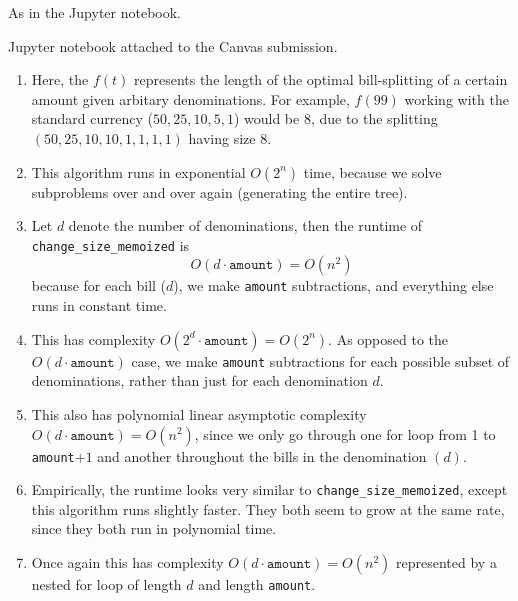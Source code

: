 \begin{prob}
    As in the Jupyter notebook.
\end{prob}
\begin{solution}
    Jupyter notebook attached to the Canvas submission.
   \begin{enumerate}[label=(\alph*)]
   \setlength\itemsep{-.2em}
       \item Here, the $f(t)$ represents the length of the optimal bill-splitting of a certain amount given arbitary denominations. For example, $f(99)$ working with the standard currency ($50,25,10,5,1$) would be 8, due to the splitting $(50,25,10,10,1,1,1,1)$ having size 8.
       \item This algorithm runs in exponential $O(2^n )$ time, because we solve subproblems over and over again (generating the entire tree).
       \item Let $d$ denote the number of denominations, then the runtime of \texttt{change\_size\_memoized} is 
           \[
           O(d\cdot \texttt{amount})= O(n^2)
       \] because for each bill ($d$), we make \texttt{amount} subtractions, and everything else runs in constant time.
   \item This has complexity $O(2^d\cdot \texttt{amount})=O(2^n )$. As opposed to the $O(d \cdot \texttt{amount}) $ case, we make \texttt{amount} subtractions for each possible subset of denominations, rather than just for each denomination $d$.
   \item This also has polynomial linear asymptotic complexity $O(d\cdot \texttt{amount})=O(n^2)$, since we only go through one for loop from 1 to \texttt{amount}$+1$ and another throughout the bills in the denomination $(d) $.
    \item Empirically, the runtime looks very similar to \texttt{change\_size\_memoized}, except this algorithm runs slightly faster. They both seem to grow at the same rate, since they both run in polynomial time.
    \item Once again this has complexity $O(d \cdot \texttt{amount})=O(n^2) $ represented by a nested for loop of length $d$ and length \texttt{amount}.
   \end{enumerate}
\end{solution}
